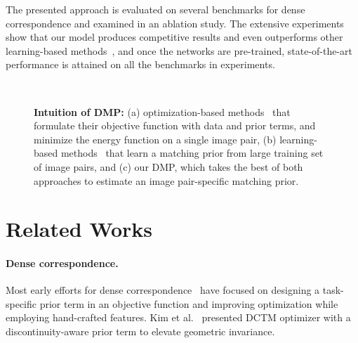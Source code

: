 \documentclass[10pt,twocolumn,letterpaper]{article}
\begin{document}
The presented approach is evaluated on several benchmarks for dense correspondence and examined in an ablation study. The extensive experiments show that our model produces competitive results and even outperforms other learning-based methods~\cite{rocco2017convolutional,Sun_2018_CVPR,shen2019self,melekhov2019dgc,truong2020glu}, and once the networks are pre-trained, state-of-the-art performance is attained on all the benchmarks in experiments.

\begin{figure*}[t]
	\centering
	\renewcommand{\thesubfigure}{}
	\hfill
	\hfill
	\hfill\\
	\caption{\textbf{Intuition of DMP:} (a) optimization-based methods~\cite{liu2010sift,taniai2016joint,kim2017dctm} that formulate their objective function with data and prior terms, and minimize the energy function on a single image pair, (b) learning-based methods~\cite{melekhov2019dgc,truong2020glu,shen2020ransac} that learn a matching prior from large training set of image pairs, and (c) our DMP, which takes the best of both approaches to estimate an image pair-specific matching prior.}\label{img:2}\vspace{-10pt}
\end{figure*} 

\section{Related Works}
\paragraph{Dense correspondence.}
Most early efforts for dense correspondence~\cite{liu2010sift,kim2013deformable,taniai2016joint} have focused on designing a task-specific prior term in an objective function and improving optimization while employing hand-crafted features. Kim et al.~\cite{kim2017dctm} presented DCTM optimizer with a discontinuity-aware prior term to elevate geometric invariance. 
\end{document}
